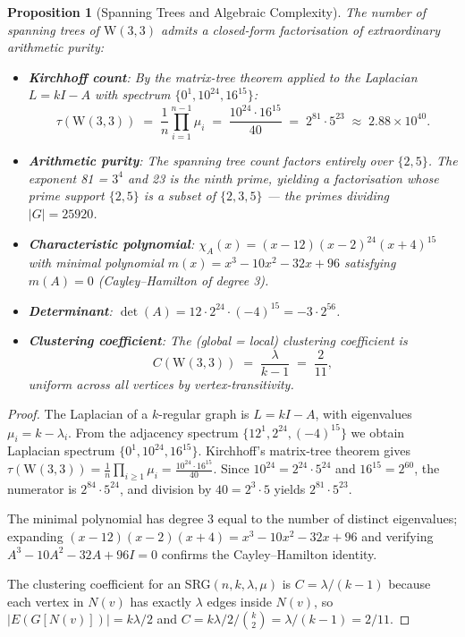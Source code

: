 \documentclass[12pt,a4paper]{article}
\newtheorem{proposition}[theorem]{Proposition}
\newcommand{\W}{\mathrm{W}(3,3)}
\begin{document}
\begin{proposition}[Spanning Trees and Algebraic Complexity]\label{prop:spanningtrees}
The number of spanning trees of $\W$ admits a closed-form factorisation of
extraordinary arithmetic purity:
\begin{itemize}
  \item \textbf{Kirchhoff count}: By the matrix-tree theorem applied to the Laplacian
        $L = kI - A$ with spectrum $\{0^1, 10^{24}, 16^{15}\}$:
        \[
          \tau(\W) \;=\; \frac{1}{n}\prod_{i=1}^{n-1}\mu_i
            \;=\; \frac{10^{24}\cdot 16^{15}}{40}
            \;=\; 2^{81}\cdot 5^{23}
            \;\approx\; 2.88 \times 10^{40}.
        \]
  \item \textbf{Arithmetic purity}: The spanning tree count factors entirely over $\{2,5\}$.
        The exponent 81 = $3^4$ and 23 is the ninth prime, yielding a factorisation
        whose prime support $\{2,5\}$ is a subset of $\{2,3,5\}$ --- the primes dividing $|G|=25920$.
  \item \textbf{Characteristic polynomial}: $\chi_A(x) = (x-12)(x-2)^{24}(x+4)^{15}$
        with minimal polynomial $m(x) = x^3 - 10x^2 - 32x + 96$ satisfying
        $m(A)=0$ (Cayley--Hamilton of degree 3).
  \item \textbf{Determinant}: $\det(A) = 12\cdot 2^{24}\cdot(-4)^{15} = -3\cdot 2^{56}$.
  \item \textbf{Clustering coefficient}: The (global = local) clustering coefficient is
        \[
          C(\W) \;=\; \frac{\lambda}{k-1} \;=\; \frac{2}{11},
        \]
        uniform across all vertices by vertex-transitivity.
\end{itemize}
\end{proposition}

\begin{proof}
The Laplacian of a $k$-regular graph is $L = kI - A$, with eigenvalues $\mu_i = k - \lambda_i$.
From the adjacency spectrum $\{12^1, 2^{24}, (-4)^{15}\}$ we obtain Laplacian spectrum
$\{0^1, 10^{24}, 16^{15}\}$.  Kirchhoff's matrix-tree theorem gives
$\tau(\W) = \frac{1}{n}\prod_{i\ge 1}\mu_i = \frac{10^{24}\cdot 16^{15}}{40}$.
Since $10^{24} = 2^{24}\cdot 5^{24}$ and $16^{15} = 2^{60}$, the numerator is $2^{84}\cdot 5^{24}$,
and division by $40 = 2^3\cdot 5$ yields $2^{81}\cdot 5^{23}$.

The minimal polynomial has degree 3 equal to the number of distinct eigenvalues; expanding
$(x-12)(x-2)(x+4) = x^3 - 10x^2 - 32x + 96$ and verifying $A^3 - 10A^2 - 32A + 96I = 0$
confirms the Cayley--Hamilton identity.

The clustering coefficient for an SRG$(n,k,\lambda,\mu)$ is $C = \lambda/(k-1)$ because each
vertex in $N(v)$ has exactly $\lambda$ edges inside $N(v)$, so $|E(G[N(v)])| = k\lambda/2$ and
$C = k\lambda/2 \big/ \binom{k}{2} = \lambda/(k-1) = 2/11$.
\end{proof}
\end{document}
